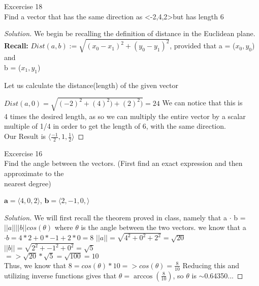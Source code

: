\documentclass[12pt]{article}
\newenvironment{statement}[2][Section]{\begin{trivlist}
\item[\hskip \labelsep {\bfseries #1}\hskip \labelsep {\bfseries #2.}]}{\end{trivlist}}
\newenvironment{solution}{\begin{proof}[Solution]}{\end{proof}}
\begin{document}
\thispagestyle{secondpage} %
\begin{statement}{10.2}
	Excercise 18 \\
	Find a vector that has the same direction as \textless-2,4,2\textgreater but has length 6
	
	\begin{solution}
		
		We begin be recalling the definition of distance in the Euclidean plane.\\
		
		\textbf{Recall:} $ Dist(a,b) := \sqrt{(x_0 - x_1)^2 + (y_0 - y_1)^2}$, provided that a = ($x_0, y_0$) and\\
		b = ($x_1,y_1$)
		
		Let us calculate the distance(length) of the given vector
		
		$ Dist(a,0) = \sqrt{(-2)^2 + (4)^2) + (2)^2)} = 24 $
		We can notice that this is \\
		4 times the desired length, as so we can multiply the entire vector by a scalar\\
		multiple of 1/4
		in order to get the length of 6, with the same direction.\\
		Our Result is   $\langle \frac{-1}{2}, 1, \frac{1}{2} \rangle$
		
		
	\end{solution}
	
	
	
	
	
\end{statement}

\begin{statement}{10.3}
	Excercise 16\\
	Find the angle between the vectors. (First find an exact expression and then approximate to the\\
	nearest degree)
	
	$\textbf{a} = \langle 4,0,2 \rangle$,   $ \textbf{b} = \langle 2,-1,0,\rangle$
	\begin{solution}
		We will first recall the theorem proved in class, namely that
		a $\cdot$ b = $||a|| ||b|| cos(\theta)$ where $\theta$ is the angle between the two vectors.
		we know that a $\cdot b = 4*2 + 0*-1 + 2*0 = 8$
		$||a|| = \sqrt{4^2 + 0^2 + 2^2} = \sqrt{20}$\\
		$||b|| = \sqrt{2^2 + -1^2 + 0^2} = \sqrt{5}$\\
		$ => \sqrt{20} * \sqrt{5} = \sqrt{100} = 10 $\\
		
		Thus, we know that $ 8 = cos(\theta) * 10 => cos(\theta) = \frac{8}{10} $ Reducing this and utilizing
		inverse functions gives that $\theta = \arccos(\frac{8}{10})$, so 
		$\theta$ is $\sim$0.64350...
		\newpage
		
		
		
		
	\end{solution}
\end{statement}
\end{document}
